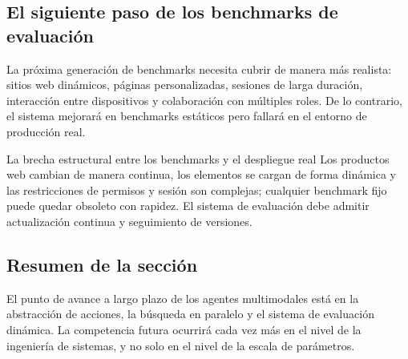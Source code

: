 \subsection{El siguiente paso de los benchmarks de evaluación}
La próxima generación de benchmarks necesita cubrir de manera más realista: sitios web dinámicos, páginas personalizadas, sesiones de larga duración, interacción entre dispositivos y colaboración con múltiples roles. De lo contrario, el sistema mejorará en benchmarks estáticos pero fallará en el entorno de producción real.

\begin{warningbox}{La brecha estructural entre los benchmarks y el despliegue real}
Los productos web cambian de manera continua, los elementos se cargan de forma dinámica y las restricciones de permisos y sesión son complejas; cualquier benchmark fijo puede quedar obsoleto con rapidez. El sistema de evaluación debe admitir actualización continua y seguimiento de versiones.
\end{warningbox}

\subsection{Resumen de la sección}
El punto de avance a largo plazo de los agentes multimodales está en la abstracción de acciones, la búsqueda en paralelo y el sistema de evaluación dinámica. La competencia futura ocurrirá cada vez más en el nivel de la ingeniería de sistemas, y no solo en el nivel de la escala de parámetros.
